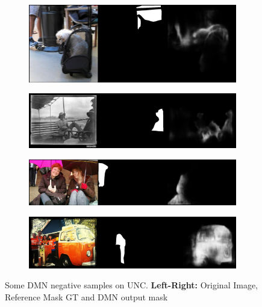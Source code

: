 \begin{figure}[!htbp]
    \centering
    \begin{subfigure}[b]{\columnwidth}
            \centering
            \includegraphics[width=\textwidth]{./figures/unc_samples/1_neg.png}
    \end{subfigure}
    
    \begin{subfigure}[b]{\columnwidth}
            \centering
            \includegraphics[width=\textwidth]{./figures/unc_samples/2_neg.png}
    \end{subfigure}
    
    \begin{subfigure}[b]{\columnwidth}
            \centering
            \includegraphics[width=\textwidth]{./figures/unc_samples/3_neg.png}
    \end{subfigure}
    
    \begin{subfigure}[b]{\columnwidth}
            \centering
            \includegraphics[width=\textwidth]{./figures/unc_samples/4_neg.png}
    \end{subfigure}
    \caption{Some DMN negative samples on UNC. \textbf{Left-Right:} Original Image, Reference Mask GT and DMN output mask}
    \label{Fig:UNC_Neg}
\end{figure}
\FloatBarrier

